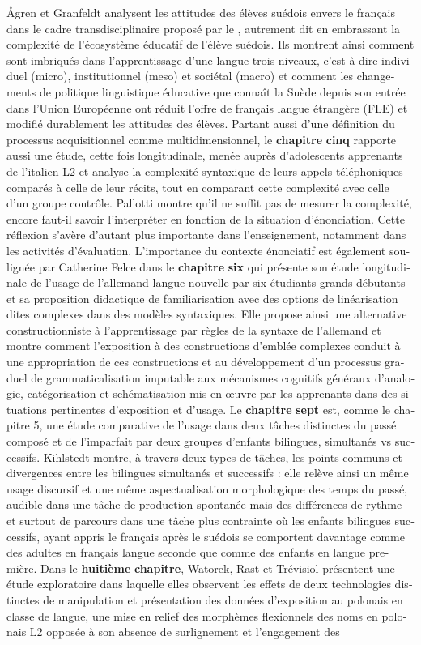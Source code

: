 \documentclass[output=paper]{langscibook}
\begin{document}
\begin{otherlanguage}{french}
Ågren et Granfeldt analysent les attitudes des élèves suédois envers le français dans le cadre transdisciplinaire proposé par le \citet{TheDouglasFirgroup2016}, autrement dit en embrassant la complexité de l’écosystème éducatif de l’élève suédois. Ils montrent ainsi comment sont imbriqués dans l’apprentissage d’une langue trois niveaux, c'est-à-dire individuel (micro), institutionnel (meso) et sociétal (macro) et comment les changements de politique linguistique éducative que connaît la Suède depuis son entrée dans l’Union Européenne ont réduit l’offre de français langue étrangère (FLE) et modifié durablement les attitudes des élèves. Partant aussi d’une définition du processus acquisitionnel comme multidimensionnel, le {\textbf{chapitre} \textbf{cinq}} rapporte aussi une étude, cette fois longitudinale, menée auprès d’adolescents apprenants de l’italien L2 et analyse la complexité syntaxique de leurs appels téléphoniques comparés à celle de leur récits, tout en comparant cette complexité avec celle d’un groupe contrôle. Pallotti montre qu’il ne suffit pas de mesurer la complexité, encore faut-il savoir l’interpréter en fonction de la situation d’énonciation. Cette réflexion s’avère d’autant plus importante dans l’enseignement, notamment dans les activités d’évaluation. L’importance du contexte énonciatif est également soulignée par Catherine Felce dans le {\textbf{chapitre}  \textbf{six} } qui présente son étude longitudinale de l’usage de l’allemand langue nouvelle par six étudiants grands débutants et sa proposition didactique de familiarisation avec des options de linéarisation dites complexes dans des modèles syntaxiques. Elle propose ainsi une alternative constructionniste à l’apprentissage par règles de la syntaxe de l’allemand et montre comment l’exposition à des constructions d’emblée complexes conduit à une appropriation de ces constructions et au développement d’un processus graduel de grammaticalisation imputable aux mécanismes cognitifs généraux d’analogie, catégorisation et schématisation mis en œuvre par les apprenants dans des situations pertinentes d’exposition et d’usage. Le {\textbf{chapitre} \textbf{sept}} est, comme le chapitre 5, une étude comparative de l’usage dans deux tâches distinctes du passé composé et de l’imparfait par deux groupes d’enfants bilingues, simultanés vs successifs. Kihlstedt montre, à travers deux types de tâches, les points communs et divergences entre les bilingues simultanés et successifs : elle relève ainsi un même usage discursif et une même aspectualisation morphologique des temps du passé, audible dans une tâche de production spontanée mais des différences de rythme et surtout de parcours dans une tâche plus contrainte où les enfants bilingues successifs, ayant appris le français après le suédois se comportent davantage comme des adultes en français langue seconde que comme des enfants en langue première. Dans le \textbf{huitième} \textbf{chapitre}, Watorek, Rast et Trévisiol présentent une étude exploratoire dans laquelle elles observent les effets de deux technologies distinctes de manipulation et présentation des données d’exposition au polonais en classe de langue, une mise en relief des morphèmes flexionnels des noms en polonais L2 opposée à son absence de surlignement et l’engagement des 
\end{otherlanguage}
\end{document}
